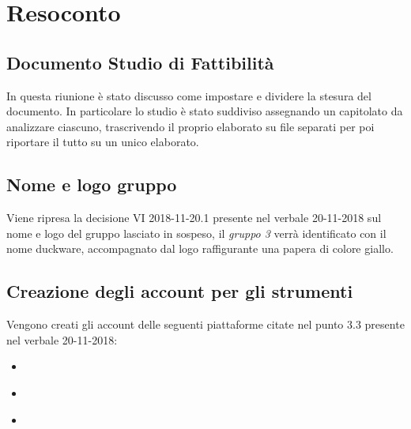 \clearpage
\section{Resoconto}
	\subsection{Documento Studio di Fattibilità}
	\label{sec:documento_studio_fattibilità}
	In questa riunione è stato discusso come impostare e dividere la stesura del documento. In particolare lo studio è stato suddiviso assegnando un capitolato da analizzare ciascuno, trascrivendo il proprio elaborato su file separati per poi riportare il tutto su un unico elaborato. 
	
	\subsection{Nome e logo gruppo}
	\label{sec:nome_logo}
	Viene ripresa la decisione VI 2018-11-20.1 presente nel verbale 20-11-2018 sul nome e logo del gruppo lasciato in sospeso, il \emph{gruppo 3} verrà identificato con il nome duckware, accompagnato dal logo raffigurante una papera di colore giallo.
	
	\subsection{Creazione degli account per gli strumenti}
	\label{sec:account_studenti}
	Vengono creati gli account delle seguenti piattaforme citate nel punto 3.3 presente nel verbale 20-11-2018:
		\begin{itemize}
		\item \textbf{}
		\item \textbf{}
		\item \textbf{}
	\end{itemize}